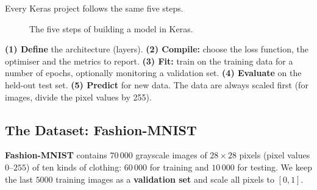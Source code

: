 Every Keras project follows the same five steps.

\begin{figure}[!htbp]
\centering
{}
\caption{The five steps of building a model in Keras.}\label{fig:kerasflow}
\end{figure}

\begin{explain}
\textbf{(1) Define} the architecture (layers). \textbf{(2) Compile:} choose the loss function, the optimiser and the metrics to report. \textbf{(3) Fit:} train on the training data for a number of epochs, optionally monitoring a validation set. \textbf{(4) Evaluate} on the held-out test set. \textbf{(5) Predict} for new data. The data are always scaled first (for images, divide the pixel values by 255).
\end{explain}

\subsection{The Dataset: Fashion-MNIST}

\textbf{Fashion-MNIST} contains $70\,000$ grayscale images of $28\times28$ pixels (pixel values $0$--$255$) of ten kinds of clothing: $60\,000$ for training and $10\,000$ for testing. We keep the last $5000$ training images as a \textbf{validation set} and scale all pixels to $[0,1]$.

